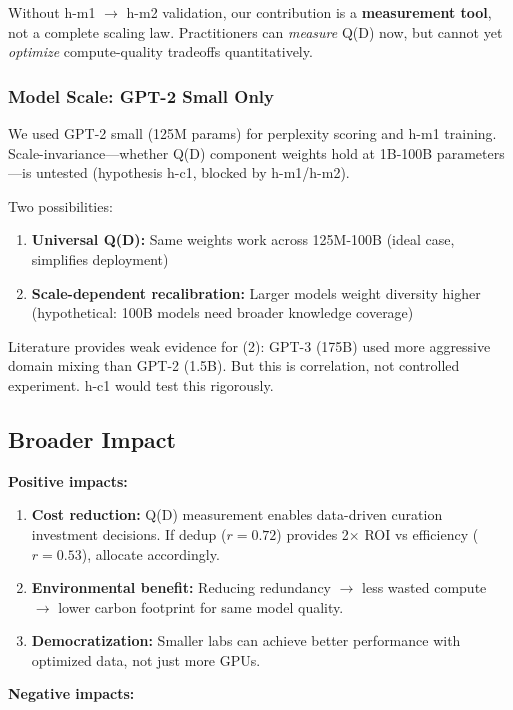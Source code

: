 Without h-m1 $\rightarrow$ h-m2 validation, our contribution is a \textbf{measurement tool}, not a complete scaling law. Practitioners can \textit{measure} Q(D) now, but cannot yet \textit{optimize} compute-quality tradeoffs quantitatively.

\subsubsection{Model Scale: GPT-2 Small Only}

We used GPT-2 small (125M params) for perplexity scoring and h-m1 training. Scale-invariance---whether Q(D) component weights hold at 1B-100B parameters---is untested (hypothesis h-c1, blocked by h-m1/h-m2).

Two possibilities:

\begin{enumerate}
\item \textbf{Universal Q(D):} Same weights work across 125M-100B (ideal case, simplifies deployment)
\item \textbf{Scale-dependent recalibration:} Larger models weight diversity higher (hypothetical: 100B models need broader knowledge coverage)
\end{enumerate}

Literature provides weak evidence for (2): GPT-3 (175B) used more aggressive domain mixing than GPT-2 (1.5B). But this is correlation, not controlled experiment. h-c1 would test this rigorously.

\subsection{Broader Impact}

\textbf{Positive impacts:}

\begin{enumerate}
\item \textbf{Cost reduction:} Q(D) measurement enables data-driven curation investment decisions. If dedup ($r=0.72$) provides 2$\times$ ROI vs efficiency ($r=0.53$), allocate accordingly.
\item \textbf{Environmental benefit:} Reducing redundancy $\rightarrow$ less wasted compute $\rightarrow$ lower carbon footprint for same model quality.
\item \textbf{Democratization:} Smaller labs can achieve better performance with optimized data, not just more GPUs.
\end{enumerate}

\textbf{Negative impacts:}

